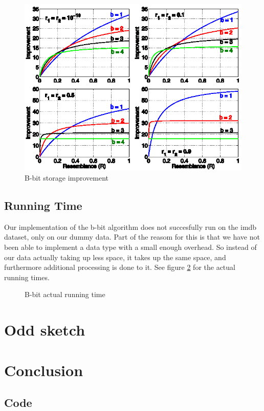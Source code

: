 \documentclass[a4paper,11pt]{article}
\begin{document}
\begin{figure}[!htpb]
    \begin{center}
        \includegraphics{plots/bbit/bbit.eps}
        \caption{B-bit storage improvement}
        \label{fig:bbit}
    \end{center}
\end{figure}


\subsection{Running Time}
Our implementation of the b-bit algorithm does not succesfully run on the imdb dataset, only on our dummy data. Part of the reasom for this is that we have not been able to implement a data type with a small enough overhead. So instead of our data actually taking up less space, it takes up the same space, and furthermore additional processing is done to it. See figure \ref{fig:bbit_at} for the actual running times.\\

\begin{figure}[!htpb]
    \begin{center}
        \caption{B-bit actual running time}
        \label{fig:bbit_at}
    \end{center}
\end{figure}


\section{Odd sketch}

\section{Conclusion}
\newpage

\begin{appendices}
\section{Code}

\end{appendices}
\end{document}
